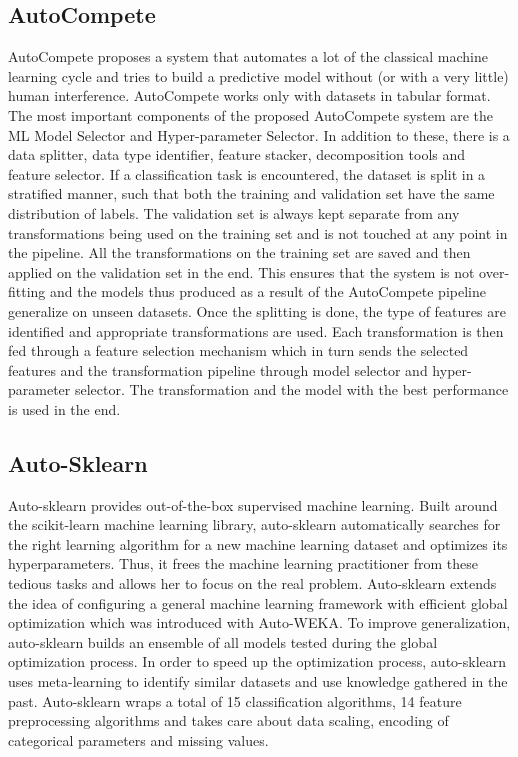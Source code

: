 \documentclass[10pt,onecolumn]{IEEEtran}
\begin{document}
\subsection{AutoCompete}
AutoCompete proposes a system that automates a lot of the classical machine learning cycle and tries to build a predictive model without (or with a very little) human interference. AutoCompete works only with datasets in tabular format. The most important components of the proposed AutoCompete system are the ML Model Selector and Hyper-parameter Selector. In addition to these, there is a data splitter, data type identifier, feature stacker, decomposition tools and feature selector. If a classification task is encountered, the dataset is split in a stratified manner, such that both the training and validation set have the same distribution of labels. The validation set is always kept separate from any transformations being used on the training set and is not touched at any point in the pipeline. All the transformations on the training set are saved and then applied on the validation set in the end. This ensures that the system is not over-fitting and the models thus produced as a result of the AutoCompete pipeline generalize on unseen datasets. Once the splitting is done, the type of features are identified and appropriate transformations are used. Each transformation is then fed through a feature selection mechanism which in turn sends the selected features and the transformation pipeline through model selector and hyper-parameter selector. The transformation and the model with the best performance is used in the end.
\subsection{Auto-Sklearn}
Auto-sklearn provides out-of-the-box supervised machine learning. Built around the scikit-learn machine learning library, auto-sklearn automatically searches for the right learning algorithm for a new machine learning dataset and optimizes its hyperparameters. Thus, it frees the machine learning practitioner from these tedious tasks and allows her to focus on the real problem. Auto-sklearn extends the idea of configuring a general machine learning framework with efficient global optimization which was introduced with Auto-WEKA. To improve generalization, auto-sklearn builds an ensemble of all models tested during the global optimization process. In order to speed up the optimization process, auto-sklearn uses meta-learning to identify similar datasets and use knowledge gathered in the past. Auto-sklearn wraps a total of 15 classification algorithms, 14 feature preprocessing algorithms and takes care about data scaling, encoding of categorical parameters and missing values.
\end{document}
